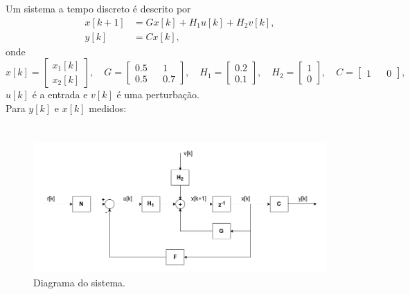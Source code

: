 \documentclass{article}
\begin{document}
{Um sistema a tempo discreto é descrito por}
\begin{align*}
    x[k+1] &= Gx[k] + H_1u[k] + H_2v[k],\\
    y[k] &= Cx[k],
\end{align*}
{onde}
\[
    x[k] =
    \begin{bmatrix}
        x_1[k]\\
        x_2[k]
    \end{bmatrix}
    ,\quad
    G =
    \begin{bmatrix}
        0.5 && 1\\
        0.5 && 0.7
    \end{bmatrix}
    ,\quad
    H_1 =
    \begin{bmatrix}
        0.2\\
        0.1
    \end{bmatrix}
    ,\quad
    H_2 =
    \begin{bmatrix}
        1\\
        0
    \end{bmatrix}
    ,\quad
    C =
    \begin{bmatrix}
        1 && 0
    \end{bmatrix}
    ,\quad
\]
{$u[k]$ é a entrada e $v[k]$ é uma perturbação.}\\

{Para $y[k]$ e $x[k]$ medidos:}
\section{\normalsize {}}

    \begin{figure}[H]
        \centering
        \includegraphics[width=1\linewidth]{images/diagram_q1.png}
        \caption{Diagrama do sistema.}\label{fig:diagram_q1}
    \end{figure}
\end{document}
